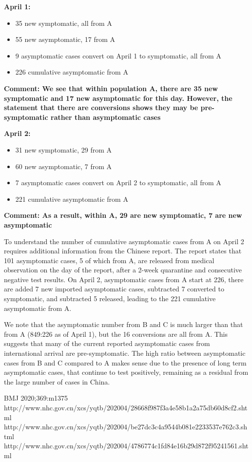 \documentclass[onecolumn,journal]{IEEEtran}
\begin{document}
\begin{multicols}{2}
\bigskip
\textbf{April 1:}
\begin{itemize}
    \item 35 new symptomatic, all from A
    \item 55 new asymptomatic, 17 from A
    \item 9 asymptomatic cases convert on April 1 to symptomatic, all from A
    \item 226 cumulative asymptomatic from A
\end{itemize}
\textbf{Comment: We see that within population A, there are 35 new symptomatic and 17 new asymptomatic for this day. However, the statement that there are conversions shows they may be pre-symptomatic rather than asymptomatic cases}

\bigskip
\textbf{April 2:}
\begin{itemize}
    \item 31 new symptomatic, 29 from A
    \item 60 new asymptomatic, 7 from A
    \item 7 asymptomatic cases convert on April 2 to symptomatic, all from A
    \item 221 cumulative asymptomatic from A
\end{itemize}
\textbf{Comment: As a result, within A, 29 are new symptomatic, 7 are new asymptomatic}
\newline

To understand the number of cumulative asymptomatic cases from A on April 2 requires additional information from the Chinese report. The report states that 101 asymptomatic cases, 5 of which from A, are released from medical observation on the day of the report, after a 2-week quarantine and consecutive negative test results. On April 2, asymptomatic cases from A start at 226, there are added 7 new imported asymptomatic cases, subtracted 7 converted to symptomatic, and subtracted 5 released, leading to the 221 cumulative asymptomatic from A.

We note that the asymptomatic number from B and C is much larger than that from A (849:226 as of April 1), but the 16 conversions are all from A. This suggests that many of the current reported asymptomatic cases from international arrival are pre-symptomatic. The high ratio between asymptomatic cases from B and C compared to A makes sense due to the presence of long term asymptomatic cases, that continue to test positively, remaining as a residual from the large number of cases in China.


\end{multicols}


\begin{thebibliography}{20}
 BMJ 2020;369:m1375
 http://www.nhc.gov.cn/xcs/yqtb/202004/28668f987f3a4e58b1a2a75db60d8cf2.shtml
\newline
http://www.nhc.gov.cn/xcs/yqtb/202004/be27dc3c4a9544b081e2233537e762c3.shtml
\newline
http://www.nhc.gov.cn/xcs/yqtb/202004/4786774c1fd84e16b29d872f95241561.shtml

\end{thebibliography}


% 
\end{document}
